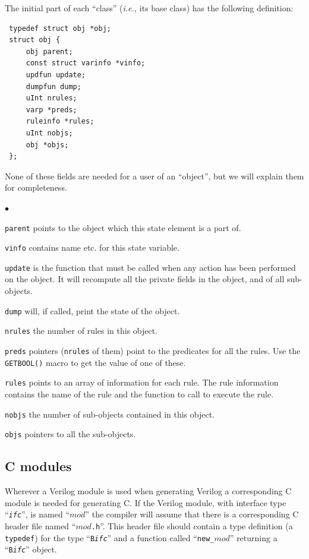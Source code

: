 \documentclass[twoside,letterpaper]{article}
\newenvironment{tightlist}%
{\begin{list}{$\bullet$}{%
    \setlength{\topsep}{0in}
    \setlength{\partopsep}{0in}
    \setlength{\itemsep}{0in}
    \setlength{\parsep}{0in}
    \setlength{\leftmargin}{1.5em}
    \setlength{\rightmargin}{0in}
    \setlength{\itemindent}{0in}
}
}%
{\end{list}
}
\newcommand{\ie}{\emph{i.e.,}}
\newcommand{\veri}{Verilog}
\newcommand{\te}[1]{\texttt{#1}}
\newcommand{\qbs}[1]{``\mbox{\te{#1}}''}
\begin{document}
The initial part of each ``class'' ({\ie} its base class) has the
following definition:
\begin{verbatim}
 typedef struct obj *obj;
 struct obj {
     obj parent;
     const struct varinfo *vinfo;
     updfun update;
     dumpfun dump;
     uInt nrules;
     varp *preds;
     ruleinfo *rules;
     uInt nobjs;
     obj *objs;
 };
\end{verbatim}
None of these fields are needed for a user of an ``object'', but we will
explain them for completeness.
\begin{tightlist}
\item \te{parent} points to the object which this state element is a part of.
\item \te{vinfo} contains name etc. for this state variable.
\item \te{update} is the function that must be called when any action has been performed on the object.         It will recompute all the private fields in the object, and of all sub-objects.
\item \te{dump} will, if called, print the state of the object.
\item \te{nrules} the number of rules in this object.
\item \te{preds} pointers (\te{nrules} of them) point to the predicates for all the rules.
        Use the \te{GETBOOL()} macro to get the value of one of these.
\item \te{rules} points to an array of information for each rule.
        The rule information contains the name of the rule and the function to call to execute the rule.
\item \te{nobjs} the number of sub-objects contained in this object.
\item \te{objs} pointers to all the sub-objects.
\end{tightlist}


\subsection{C modules}

Wherever a {\veri} module is used when generating {\veri} a
corresponding C module is needed for generating C.  If the {\veri}
module, with interface type \qbs{{\rm\emph{ifc}}}, is named
\qbs{$mod$} the compiler will assume that there is a corresponding C
header file named {\qbs{$mod$.h}}.  This header file should contain a
type definition (a {\te{typedef}}) for the type \qbs{B{\rm\emph{ifc}}}
and a function called {\qbs{new\_$mod$}} returning a
{\qbs{B{\rm\emph{ifc}}}} object.
\end{document}
